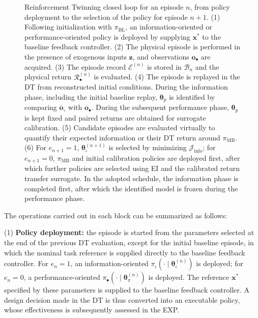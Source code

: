 \documentclass[journal]{IEEEtran}
\begin{document}
\begin{figure}[t]
{\begin{tikzpicture}
\end{tikzpicture}%
}
\caption{Reinforcement Twinning closed loop for an episode $n$, from policy deployment to the selection of the policy for episode $n+1$. (1) Following initialization with $\pi_{\mathrm{BL}}$, an information-oriented or performance-oriented policy is deployed by supplying $\mathbf x^\ast$ to the baseline feedback controller. (2) The physical episode is performed in the presence of exogenous inputs $\mathbf z$, and observations $\mathbf o_\bullet$ are acquired. (3) The episode record $\mathcal E^{(n)}$ is stored in $\mathcal B_n$ and the physical return $\mathcal R_\bullet^{(n)}$ is evaluated. (4) The episode is replayed in the DT from reconstructed initial conditions. During the information phase, including the initial baseline replay, $\boldsymbol{\theta}_p$ is identified by comparing $\overline{\mathbf o}_\circ$ with $\mathbf o_\bullet$. During the subsequent performance phase, $\boldsymbol{\theta}_p$ is kept fixed and paired returns are obtained for surrogate calibration. (5) Candidate episodes are evaluated virtually to quantify their expected information or their DT return around $\pi_{\mathrm{MB}}$. (6) For $e_{n+1}=1$, $\boldsymbol{\theta}_\iota^{(n+1)}$ is selected by minimizing $\mathcal J_{\mathrm{info}}$; for $e_{n+1}=0$, $\pi_{\mathrm{MB}}$ and initial calibration policies are deployed first, after which further policies are selected using EI and the calibrated return transfer surrogate. In the adopted schedule, the information phase is completed first, after which the identified model is frozen during the performance phase.}
\label{fig:rt_framework} 
\end{figure}
  
The operations carried out in each block can be summarized as follows:

(1) \textbf{Policy deployment:} the episode is started from the parameters selected at the end of the previous DT evaluation, except for the initial baseline episode, in which the nominal task reference is supplied directly to the baseline feedback controller.
For $e_n=1$, an information-oriented $\pi_\iota(\cdot\mid\boldsymbol{\theta}_\iota^{(n)})$ is deployed; for $e_n=0$, a performance-oriented $\pi_\bullet(\cdot\mid\boldsymbol{\theta}_\pi^{(n)})$ is deployed. The reference $\mathbf{x}^{\ast}$ specified by these parameters is supplied to the baseline feedback controller. A design decision made in the DT is thus converted into an executable policy, whose effectiveness is subsequently assessed in the EXP.
\end{document}

